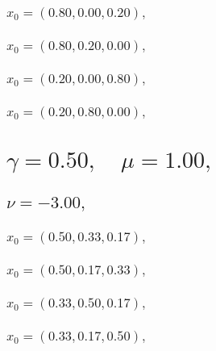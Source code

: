 \documentclass[a4paper]{article}
\begin{document}
\begin{multicols*}{2}
   \subsubsection{\(x_0 = (0.80,0.00,0.20),\quad \)}
   

   \subsubsection{\(x_0 = (0.80,0.20,0.00),\quad \)}
   

   \subsubsection{\(x_0 = (0.20,0.00,0.80),\quad \)}
   

   \subsubsection{\(x_0 = (0.20,0.80,0.00),\quad \)}
   

   \section{\(\gamma = 0.50,\quad \mu = 1.00,\quad \)}
   

   \subsection{\(\nu = -3.00,\quad \)}
   

   \subsubsection{\(x_0 = (0.50,0.33,0.17),\quad \)}
   

   \subsubsection{\(x_0 = (0.50,0.17,0.33),\quad \)}
   

   \subsubsection{\(x_0 = (0.33,0.50,0.17),\quad \)}
   

   \subsubsection{\(x_0 = (0.33,0.17,0.50),\quad \)}
   


\end{multicols*}
\end{document}
